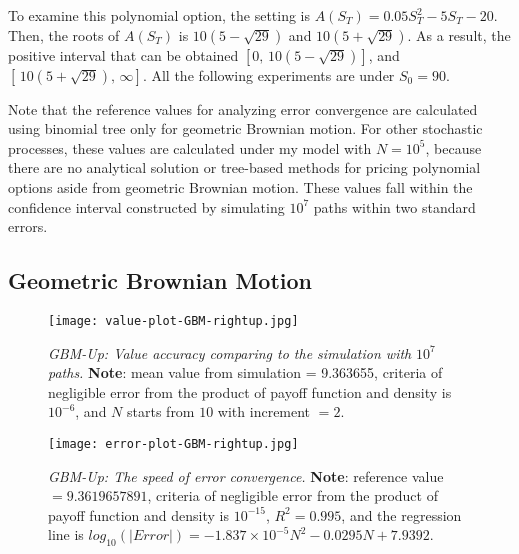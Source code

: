 To examine this polynomial option, the setting is $A(S_T)=0.05S_T^2-5S_T-20$. Then, the roots of $A(S_T)$ is $10\left( 5 - \sqrt{29} \right)$ and $10\left( 5 + \sqrt{29} \right)$. As a result, the positive interval that can be obtained $\left[0, \, 10\left( 5 - \sqrt{29} \right)\right]$, and $\left[ \, 10\left( 5 + \sqrt{29} \right),  \,\infty \right]$. All the following experiments are under $S_0=90$.

Note that the reference values for analyzing error convergence are calculated using binomial tree only for geometric Brownian motion. For other stochastic processes, these values are calculated under my model with $N=10^5$, because there are no analytical solution or tree-based methods for pricing polynomial options aside from geometric Brownian motion. These values fall within the confidence interval constructed by simulating $10^7$ paths within two standard errors. 

\newpage

\subsection{Geometric Brownian Motion}
\begin{figure}[H]
    \centering
    \texttt{[image: value-plot-GBM-rightup.jpg]}
    \caption[\emph{GBM-Up: Value accuracy comparing to the simulation with} $10^7$ \emph{paths.}]{\emph{GBM-Up: Value accuracy comparing to the simulation with} $10^7$ \emph{paths.} \textbf{Note}: mean value from simulation = 9.363655, criteria of negligible error from the product of payoff function and density is $10^{-6}$, and $N$ starts from $10$  with increment $=2$.}

    \label{fig:label}
\end{figure}

\begin{figure}[H]
    \centering
\texttt{[image: error-plot-GBM-rightup.jpg]}
    \caption[\emph{GBM-Up: The speed of error convergence.}]{\emph{GBM-Up: The speed of error convergence.} \textbf{Note}: reference value $=9.3619657891$, criteria of negligible error from the product of payoff function and density is $10^{-15}$, $R^2=0.995$, and the regression line is $log_{10}\left(|Error|\right) = -1.837\times 10^{-5}N^2-0.0295N+7.9392$.}

    \label{fig:label}
\end{figure}


